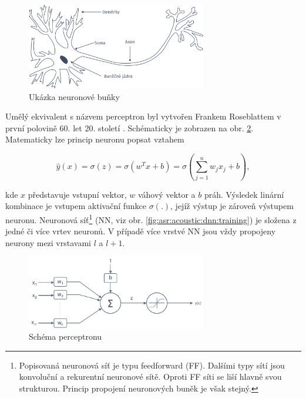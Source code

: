 \begin{figure}[hbpt]
  \centering
  \includegraphics[width=0.7\textwidth]{./ch4-asr/img/neuron-human.pdf}
  \caption{Ukázka neuronové buňky}
  \label{fig:asr:acoustic:dnn:neuron:human}
\end{figure}

Umělý ekvivalent s názvem perceptron byl vytvořen Frankem Roseblattem v první polovině 60. let 20. století \cite{Rosenblatt1962}. Schématicky je zobrazen na obr. \ref{fig:asr:acoustic:dnn:neuron:artificial}. Matematicky lze princip neuronu popsat vztahem

\begin{equation}
  \hat{y}\left(x\right) = \sigma\left(z\right) = \sigma \left(w^{T}x + b\right) = \sigma \left( \sum_{j=1}^{n} w_{j}x_{j} + b\right),
   \label{eq:asr:acoustic:dnn:neuron:output}
 \end{equation}

\noindent kde $x$ představuje vstupní vektor, $w$ váhový vektor a $b$ práh. Výsledek linární kombinace je vstupem aktivační funkce $\sigma\left(.\right)$, jejíž výstup je zároveň výstupem neuronu. Neuronová síť\footnote{Popisovaná neuronová síť je typu feedforward (FF). Dalšími typy sítí jsou konvoluční a rekurentní neuronové sítě. Oproti FF síti se liší hlavně svou strukturou. Princip propojení neuronových buněk je však stejný.} (NN, viz obr. \ref{fig:asr:acoustic:dnn:training}) je složena z jedné či více vrtev neuronů. V případě více vrstvé NN jsou vždy propojeny neurony mezi vrstavami $l$ a $l+1$.

\begin{figure}[hbpt]
  \centering
  \includegraphics[width=0.7\textwidth]{./ch4-asr/img/neuron.pdf}
  \caption{Schéma perceptronu}
  \label{fig:asr:acoustic:dnn:neuron:artificial}
\end{figure}


